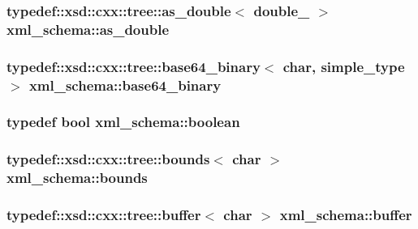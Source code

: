 \subsubsection[{\texorpdfstring{as\+\_\+double}{as_double}}]{\setlength{\rightskip}{0pt plus 5cm}typedef\+::xsd\+::cxx\+::tree\+::as\+\_\+double$<$ {\bf double\+\_\+} $>$ {\bf xml\+\_\+schema\+::as\+\_\+double}}\hypertarget{namespacexml__schema_a87206181e6830ca01769709c8652e04f}{}\label{namespacexml__schema_a87206181e6830ca01769709c8652e04f}
\subsubsection[{\texorpdfstring{base64\+\_\+binary}{base64_binary}}]{\setlength{\rightskip}{0pt plus 5cm}typedef\+::xsd\+::cxx\+::tree\+::base64\+\_\+binary$<$ char, {\bf simple\+\_\+type} $>$ {\bf xml\+\_\+schema\+::base64\+\_\+binary}}\hypertarget{namespacexml__schema_a6a44de5a5883b8a6377178c988a87b93}{}\label{namespacexml__schema_a6a44de5a5883b8a6377178c988a87b93}
\subsubsection[{\texorpdfstring{boolean}{boolean}}]{\setlength{\rightskip}{0pt plus 5cm}typedef bool {\bf xml\+\_\+schema\+::boolean}}\hypertarget{namespacexml__schema_ae5ada4ec9c54b51765c3e4c0e9631bba}{}\label{namespacexml__schema_ae5ada4ec9c54b51765c3e4c0e9631bba}
\subsubsection[{\texorpdfstring{bounds}{bounds}}]{\setlength{\rightskip}{0pt plus 5cm}typedef\+::xsd\+::cxx\+::tree\+::bounds$<$ char $>$ {\bf xml\+\_\+schema\+::bounds}}\hypertarget{namespacexml__schema_a0130942a2c58fd1fda434722d42ede1d}{}\label{namespacexml__schema_a0130942a2c58fd1fda434722d42ede1d}
\subsubsection[{\texorpdfstring{buffer}{buffer}}]{\setlength{\rightskip}{0pt plus 5cm}typedef\+::xsd\+::cxx\+::tree\+::buffer$<$ char $>$ {\bf xml\+\_\+schema\+::buffer}}\hypertarget{namespacexml__schema_a3a1af5d598f84fcd6707cc9f84880533}{}\label{namespacexml__schema_a3a1af5d598f84fcd6707cc9f84880533}
